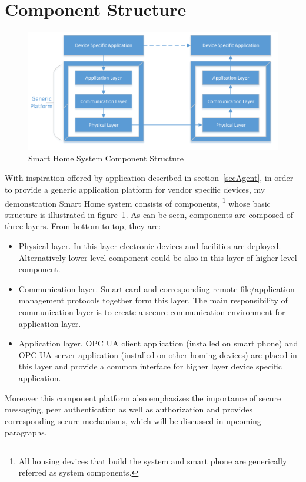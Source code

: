 \section {Component Structure}
 \begin{figure}[!htb]
	\centering
	\includegraphics[width=1.1\textwidth]{component}
		\caption{Smart Home System Component Structure}
	\label{fig:SmartHomeComponent}
\end{figure}
With inspiration offered by application described  in section~\ref{secAgent}, in order to provide a generic application platform for vendor specific devices, my demonstration Smart Home system consists of components, \footnote{All housing devices that build the system and  smart phone are generically referred as system components.} whose basic structure is illustrated in figure~\ref{fig:SmartHomeComponent}.  As can be seen, components are composed of three layers. From bottom to top, they are:

\begin{itemize}
\item Physical layer. In this layer electronic devices and facilities are deployed. Alternatively lower level component could be also in this layer of higher level component.
\item Communication layer. Smart card and corresponding remote file/application management protocols together form this layer. The main responsibility of communication layer is to create a secure communication environment for application layer.
\item Application layer. OPC UA client application (installed on smart phone) and OPC UA server application (installed on other homing devices) are placed in this layer and provide a common interface for higher layer device specific application. 
\end{itemize}

Moreover this component platform also emphasizes the importance of secure messaging, peer authentication as well as authorization and provides corresponding secure mechanisms, which will be discussed in upcoming paragraphs.

